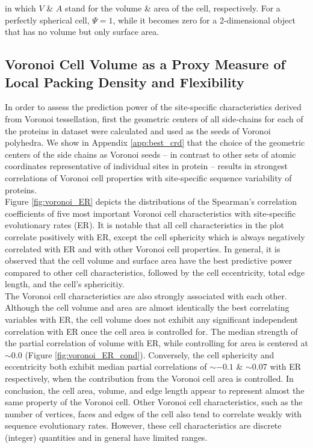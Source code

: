 \documentclass[11pt]{article}
\begin{document}
    \noindent in which $V$ \& $A$ stand for the volume \& area of the cell, respectively. For a perfectly spherical cell, $\Psi=1$, while it becomes zero for a 2-dimensional object that has no volume but only surface area.

    \subsection*{Voronoi Cell Volume as a Proxy Measure of Local Packing Density and Flexibility}



    In order to assess the prediction power of the site-specific characteristics derived from Voronoi tessellation, first the geometric centers of all side-chains for each of the proteins in dataset were calculated and used as the seeds of Voronoi polyhedra. We show in Appendix \ref{app:best_crd} that the choice of the geometric centers of the side chains as Voronoi seeds -- in contrast to other sets of atomic coordinates representative of individual sites in protein -- results in strongest correlations of Voronoi cell properties with site-specific sequence variability of proteins.  \\

    Figure \ref{fig:voronoi_ER} depicts the distributions of the Spearman's correlation coefficients of five most important Voronoi cell characteristics with site-specific evolutionary rates (ER). It is notable that all cell characteristics in the plot correlate positively with ER, except the cell sphericity which is always negatively correlated with ER and with other Voronoi cell properties. In general, it is observed that the cell volume and surface area have the best predictive power compared to other cell characteristics, followed by the cell eccentricity, total edge length, and the cell's sphericitiy. \\

    The Voronoi cell characteristics are also strongly associated with each other. Although the cell volume and area are almost identically the best correlating variables with ER, the cell volume does not exhibit any significant independent correlation with ER once the cell area is controlled for. The median strength of the partial correlation of volume with ER, while controlling for area is centered at $\sim0.0$ (Figure \ref{fig:voronoi_ER_cond}). Conversely, the cell sphericity and eccentricity both exhibit median partial correlations of $\sim-0.1$ \& $\sim0.07$ with ER respectively, when the contribution from the Voronoi cell area is controlled. In conclusion, the cell area, volume, and edge length appear to represent almost the same property of the Voronoi cell. Other Voronoi cell characteristics, such as the number of vertices, faces and edges of the cell also tend to correlate weakly with sequence evolutionary rates. However, these cell characteristics are discrete (integer) quantities and in general have limited ranges. \\
\end{document}
